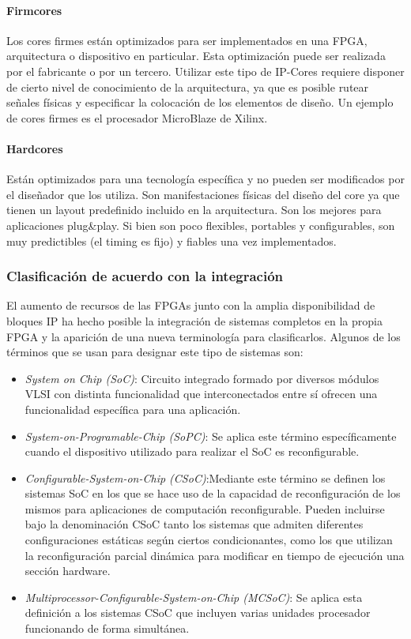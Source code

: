 			\paragraph{Firmcores}
			Los cores firmes están optimizados para ser implementados en una FPGA, arquitectura o dispositivo en particular. Esta optimización puede ser
			realizada por el fabricante o por un tercero. Utilizar este tipo de IP-Cores requiere disponer de cierto nivel de conocimiento de la arquitectura,
			ya que es posible rutear señales físicas y especificar la colocación de los elementos de diseño. Un ejemplo de cores firmes es el procesador
			MicroBlaze de Xilinx.\cite{Etiqueta04}

			\paragraph{Hardcores}
			Están optimizados para una tecnología específica y no pueden ser modificados por el diseñador que los utiliza. Son manifestaciones físicas del
			diseño del core ya que tienen un layout predefinido incluido en la arquitectura. Son los mejores para aplicaciones plug\&play. Si bien son poco
			flexibles, portables y configurables, son muy predictibles (el timing es fijo) y fiables una vez implementados.

		\subsubsection{Clasificación de acuerdo con la integración}
		El aumento de recursos de las FPGAs junto con la amplia disponibilidad de bloques IP ha hecho posible la integración de sistemas completos en la
		propia FPGA y la aparición de una nueva terminología para clasificarlos. Algunos de los términos que se usan para designar este tipo de sistemas
		son:
		\begin {itemize}
		\item 
		\textit{System on Chip (SoC)}:
 		Circuito integrado formado por diversos módulos VLSI con distinta funcionalidad que interconectados entre sí ofrecen una funcionalidad específica
 		para una aplicación.
		\item 
		\textit{System-on-Programable-Chip (SoPC)}: Se aplica este término específicamente cuando el dispositivo utilizado para realizar el SoC es
		reconfigurable.
		\item 
		\textit{Configurable-System-on-Chip (CSoC)}:Mediante este término se definen los sistemas SoC en los que se hace uso de la capacidad de
		reconfiguración de los mismos para aplicaciones de computación reconfigurable. Pueden incluirse bajo la denominación CSoC tanto los sistemas que
		admiten diferentes configuraciones estáticas según ciertos condicionantes, como los que utilizan la reconfiguración parcial dinámica para modificar
		en tiempo de ejecución una sección hardware.
		\item 
		\textit{Multiprocessor-Configurable-System-on-Chip (MCSoC)}: Se aplica esta definición a los sistemas CSoC que incluyen varias unidades procesador
		funcionando de forma simultánea.
 		\end {itemize}

